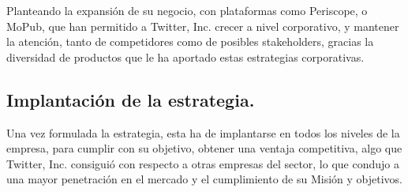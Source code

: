 Planteando la expansión de su negocio, con plataformas como Periscope, o MoPub, que han permitido a Twitter, Inc. crecer a nivel corporativo, y mantener la atención, tanto de competidores como de posibles stakeholders, gracias la diversidad de productos que le ha aportado estas estrategias corporativas.

\subsection{Implantación de la estrategia.}

Una vez formulada la estrategia, esta ha de implantarse en todos los niveles de la empresa, para cumplir con su objetivo, obtener una ventaja competitiva, algo que Twitter, Inc. consiguió con respecto a otras empresas del sector, lo que condujo a una mayor penetración en el mercado y el cumplimiento de su Misión y objetivos.




